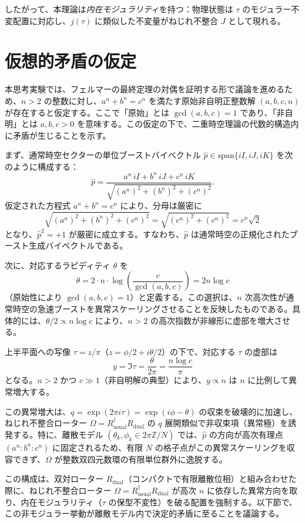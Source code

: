 \documentclass[a4paper]{article}
\begin{document}
したがって、本理論は\emph{内在モジュラリティ}を持つ：物理状態は $\tau$ のモジュラー不変配置に対応し、$j(\tau)$ に類似した不変量がねじれ不整合 $J$ として現れる。

\section{仮想的矛盾の仮定}

本思考実験では、フェルマーの最終定理の対偶を証明する形で議論を進めるため、$n > 2$ の整数に対し、$a^n + b^n = c^n$ を満たす原始非自明正整数解 $(a, b, c, n)$ が存在すると仮定する。ここで「原始」とは $\gcd(a, b, c) = 1$ であり、「非自明」とは $a, b, c > 0$ を意味する。この仮定の下で、二重時空理論の代数的構造内に矛盾が生じることを示す。

まず、通常時空セクターの単位ブーストバイベクトル $\hat{p} \in \mathrm{span}\{iI, iJ, iK\}$ を次のように構成する：
\[
\hat{p} = \frac{a^n \, iI + b^n \, iJ + c^n \, iK}{\sqrt{(a^n)^2 + (b^n)^2 + (c^n)^2}}.
\]
仮定された方程式 $a^n + b^n = c^n$ により、分母は厳密に
\[
\sqrt{(a^n)^2 + (b^n)^2 + (c^n)^2} = \sqrt{(c^n)^2 + (c^n)^2} = c^n \sqrt{2}
\]
となり、$\hat{p}^2 = +1$ が厳密に成立する。すなわち、$\hat{p}$ は通常時空の正規化されたブースト生成バイベクトルである。

次に、対応するラピディティ $\theta$ を
\[
\theta = 2 \cdot n \cdot \log\!\left( \frac{c}{\gcd(a,b,c)} \right) = 2 n \log c
\]
（原始性により $\gcd(a,b,c)=1$）と定義する。この選択は、$n$ 次高次性が通常時空の急速ブーストを異常スケーリングさせることを反映したものである。具体的には、$\theta / 2 \propto n \log c$ により、$n > 2$ の高次指数が非線形に虚部を増大させる。

上半平面への写像 $\tau = z / \pi$（$z = \phi/2 + i \theta/2$）の下で、対応する $\tau$ の虚部は
\[
y = \Im \tau = \frac{\theta}{2\pi} = \frac{n \log c}{\pi}
\]
となる。$n > 2$ かつ $c \gg 1$（非自明解の典型）により、$y \propto n$ は $n$ に比例して異常増大する。

この異常増大は、$q = \exp(2\pi i \tau) = \exp(i \phi - \theta)$ の収束を破壊的に加速し、ねじれ不整合ローター $\Omega = R_\text{usual}^\dagger R_\text{dual}$ の $q$ 展開類似で非収束項（異常極）を誘発する。特に、離散モデル $(\theta_k, \phi_k \in 2\pi \mathbb{Z}/N)$ では、$\hat{p}$ の方向が高次有理点 $(a^n : b^n : c^n)$ に固定されるため、有限 $N$ の格子点がこの異常スケーリングを収容できず、$\Omega$ が整数双四元数環の有限単位群外に逸脱する。

この構成は、双対ローター $R_\text{dual}$（コンパクトで有限離散位相）と組み合わせた際に、ねじれ不整合ローター $\Omega = R_\text{usual}^\dagger R_\text{dual}$ が高次 $n$ に依存した異常方向を取り、内在モジュラリティ（$\tau$ の保型不変性）を破る配置を強制する。以下節で、この非モジュラー挙動が離散モデル内で決定的矛盾に至ることを議論する。
\end{document}
